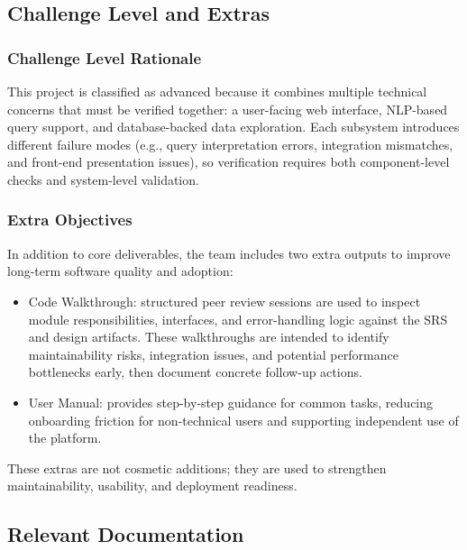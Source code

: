 \documentclass[12pt, titlepage]{article}
\begin{document}
\subsection{Challenge Level and Extras}

\subsubsection{Challenge Level Rationale}
This project is classified as advanced because it combines multiple technical concerns that must be verified together: a user-facing web interface, NLP-based query support, and database-backed data exploration. Each subsystem introduces different failure modes (e.g., query interpretation errors, integration mismatches, and front-end presentation issues), so verification requires both component-level checks and system-level validation.

\subsubsection{Extra Objectives}
In addition to core deliverables, the team includes two extra outputs to improve long-term software quality and adoption:
\begin{itemize}
  \item Code Walkthrough: structured peer review sessions are used to inspect module responsibilities, interfaces, and error-handling logic against the SRS and design artifacts. These walkthroughs are intended to identify maintainability risks, integration issues, and potential performance bottlenecks early, then document concrete follow-up actions.
  \item User Manual: provides step-by-step guidance for common tasks, reducing onboarding friction for non-technical users and supporting independent use of the platform.
\end{itemize}

These extras are not cosmetic additions; they are used to strengthen maintainability, usability, and deployment readiness.


\subsection{Relevant Documentation}
\end{document}
